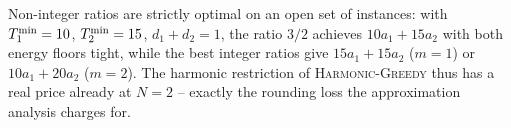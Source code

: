\begin{remark}
Non-integer ratios are strictly optimal on an open set of instances:
with $T^{\min}_1 = 10$, $T^{\min}_2 = 15$, $d_1 + d_2 = 1$, the ratio $3/2$
achieves $10 a_1 + 15 a_2$ with both energy floors tight, while the best
integer ratios give $15 a_1 + 15 a_2$ ($m{=}1$) or $10 a_1 + 20 a_2$
($m{=}2$). The harmonic restriction of \textsc{Harmonic-Greedy} thus has
a real price already at $N = 2$ -- exactly the rounding loss the
approximation analysis charges for.
\end{remark}
